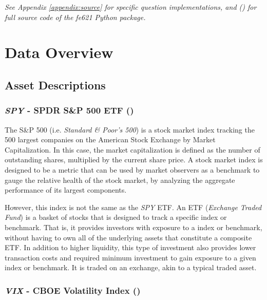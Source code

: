 \documentclass[10pt]{article}
\begin{document}
\begin{center}
    \textit{See Appendix \ref{appendix:source} for specific question implementations, and (\cite{Weerawarana2019}) for full source code of the {\normalfont fe621} Python package.}
\end{center}



\newpage

\section{Data Overview}

    \subsection{Asset Descriptions}

        \subsubsection{\textit{SPY} - SPDR S\&P 500 ETF (\cite{StateStreetGlobalAdvisors2019})}

        The S\&P 500 (i.e. \textit{Standard \& Poor's 500}) is a stock market index tracking the 500 largest companies on the American Stock Exchange by Market Capitalization. In this case, the market capitalization is defined as the number of outstanding shares, multiplied by the current share price. A stock market index is designed to be a metric that can be used by market observers as a benchmark to gauge the relative health of the stock market, by analyzing the aggregate performance of its largest components.
            
        However, this index is not the same as the \textit{SPY} ETF. An ETF (\textit{Exchange Traded Fund}) is a basket of stocks that is designed to track a specific index or benchmark. That is, it provides investors with exposure to a index or benchmark, without having to own all of the underlying assets that constitute a composite ETF. In addition to higher liquidity, this type of investment also provides lower transaction costs and required minimum investment to gain exposure to a given index or benchmark. It is traded on an exchange, akin to a typical traded asset.

        \subsubsection{\textit{VIX} - CBOE Volatility Index (\cite{CBOEChicagoBoardOptionsExchange2019})}
\end{document}
